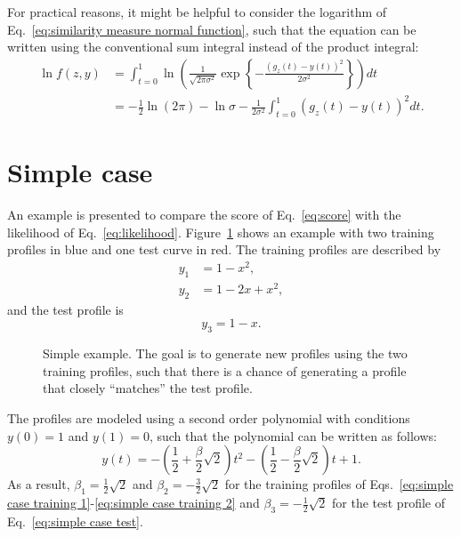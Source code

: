 \documentclass[10pt,final,a4paper,oneside,onecolumn]{article}
\newlength\figurewidth
\newlength\figureheight
\theoremstyle{plain}\newtheorem{definition}{Definition}[section]    %
\theoremstyle{definition}\newtheorem{example}{Example}[section]     %
\theoremstyle{remark}\newtheorem{remarkenv}{Remark}[section]        %
\begin{document}
For practical reasons, it might be helpful to consider the logarithm of Eq.~\eqref{eq:similarity measure normal function}, such that the equation can be written using the conventional sum integral instead of the product integral:
\begin{align}
	\ln f(z,y) &= \int_{t=0}^{1} \ln \left( \frac{1}{\sqrt{2\pi\sigma^2}} \exp \left\{ -\frac{(g_z(t)-y(t))^2}{2\sigma^2} \right\} \right) dt \\
	&= -\frac{1}{2} \ln (2\pi) - \ln \sigma - \frac{1}{2\sigma^2} \int_{t=0}^{1} (g_z(t) - y(t))^2 dt.
\end{align}



\section{Simple case}

An example is presented to compare the score of Eq.~\eqref{eq:score} with the likelihood of Eq.~\eqref{eq:likelihood}. Figure~\ref{fig:simple example profiles} shows an example with two training profiles in blue and one test curve in red. The training profiles are described by 
\begin{align}
	y_1 &= 1 - x^2, \label{eq:simple case training 1} \\
	y_2 &= 1 - 2x + x^2, \label{eq:simple case training 2}
\end{align}
and the test profile is 
\begin{equation} \label{eq:simple case test}
	y_3 = 1-x.
\end{equation}

\begin{figure}
	\centering
	\setlength\figureheight{200pt}
	\setlength\figurewidth{300pt}
	
	\caption{Simple example. The goal is to generate new profiles using the two training profiles, such that there is a chance of generating a profile that closely ``matches'' the test profile.}
	\label{fig:simple example profiles}
\end{figure}

The profiles are modeled using a second order polynomial with conditions $y(0)=1$ and $y(1)=0$, such that the polynomial can be written as follows:
\begin{equation} \label{eq:simple case spline}
	y(t) = -\left( \frac{1}{2} + \frac{\beta}{2}\sqrt{2} \right) t^2 - \left( \frac{1}{2} - \frac{\beta}{2}\sqrt{2}\right) t + 1.
\end{equation}
As a result, $\beta_1=\frac{1}{2}\sqrt{2}$ and $\beta_2=-\frac{3}{2}\sqrt{2}$ for the training profiles of Eqs.~\eqref{eq:simple case training 1}-\eqref{eq:simple case training 2} and $\beta_3=-\frac{1}{2}\sqrt{2}$ for the test profile of Eq.~\eqref{eq:simple case test}. 
\end{document}
